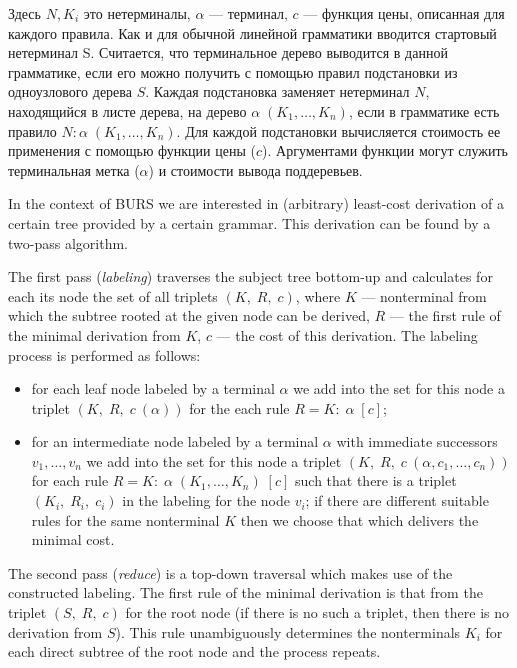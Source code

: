 Здесь $N, K_i$ это нетерминалы, $\alpha$ --- терминал,
$c$ --- функция цены, описанная для каждого правила.
Как и для обычной линейной грамматики вводится стартовый
нетерминал S. Считается, что терминальное дерево выводится в
данной грамматике, если его можно получить с помощью правил
подстановки из одноузлового дерева $S$.
Каждая подстановка заменяет нетерминал $N$, находящийся в листе дерева, на дерево 
$\alpha\;(K_1,\dots,K_n)$, если в грамматике есть правило
$N:\alpha\;(K_1,\dots,K_n)$. 
Для каждой подстановки вычисляется стоимость ее применения с помощью
функции цены ($c$).
Аргументами функции могут служить терминальная метка ($\alpha$) и стоимости
вывода поддеревьев.

In the context of BURS we are interested in (arbitrary) least-cost derivation of a certain tree provided by 
a certain grammar. This derivation can be found by a two-pass algorithm. 

The first pass (\emph{labeling}) traverses the subject tree bottom-up and calculates for each its node
the set of all triplets $(K,\;R,\;c)$, where $K$ --- nonterminal from which the subtree rooted at the given node
can be derived, $R$ --- the first rule of the minimal derivation from $K$, $c$ --- the cost of this derivation.
The labeling process is performed as follows:

\begin{itemize}
\item for each leaf node labeled by a terminal $\alpha$ we add into the set for this node a 
triplet $(K,\;R,\;c\:(\alpha))$ for the each rule $R=K:\;\alpha\;[c]$;
\item for an intermediate node labeled by a terminal $\alpha$ with immediate successors $v_1,\dots,v_n$ we
add into the set for this node a triplet $(K,\;R,\;c\:(\alpha,c_1,\dots,c_n))$ for each rule 
$R=K:\;\alpha\;(K_1,\dots,K_n)\;[c]$ such that there is a triplet $(K_i,\;R_i,\;c_i)$ in the labeling for
the node $v_i$; if there are different suitable rules for the same nonterminal $K$ then we choose that 
which delivers the minimal cost.
\end{itemize}

The second pass (\emph{reduce}) is a top-down traversal which makes use of the constructed labeling. The first
rule of the minimal derivation is that from the triplet $(S,\;R,\;c)$ for the root node (if there is no such a
triplet, then there is no derivation from $S$). This rule unambiguously determines the nonterminals $K_i$ for 
each direct subtree of the root node and the process repeats.

